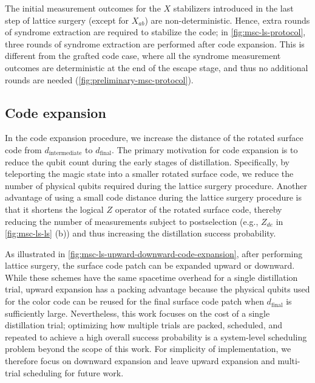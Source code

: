 The initial measurement outcomes for the $X$ stabilizers introduced in the last step of lattice surgery (except for $X_{ab}$) are non-deterministic.
Hence, extra rounds of syndrome extraction are required to stabilize the code; in \autoref{fig:msc-ls-protocol}, three rounds of syndrome extraction are performed after code expansion.
This is different from the grafted code case, where all the syndrome measurement outcomes are deterministic at the end of the escape stage, and thus no additional rounds are needed (\autoref{fig:preliminary-msc-protocol}).

\subsection{Code expansion}
\label{subsec:msc-ls-code-expansion}
In the code expansion procedure, we increase the distance of the rotated surface code from $d_{\mathrm{intermediate}}$ to $d_{\mathrm{final}}$.
The primary motivation for code expansion is to reduce the qubit count during the early stages of distillation.
Specifically, by teleporting the magic state into a smaller rotated surface code, we reduce the number of physical qubits required during the lattice surgery procedure.
Another advantage of using a small code distance during the lattice surgery procedure is that it shortens the logical $Z$ operator of the rotated surface code, thereby reducing the number of measurements subject to postselection (e.g., $Z_{de}$ in \autoref{fig:msc-ls-ls} (b)) and thus increasing the distillation success probability.


As illustrated in \autoref{fig:msc-ls-upward-downward-code-expansion}, after performing lattice surgery, the surface code patch can be expanded upward or downward.
While these schemes have the same spacetime overhead for a single distillation trial, upward expansion has a packing advantage because the physical qubits used for the color code can be reused for the final surface code patch when $d_{\mathrm{final}}$ is sufficiently large.
Nevertheless, this work focuses on the cost of a single distillation trial; optimizing how multiple trials are packed, scheduled, and repeated to achieve a high overall success probability is a system-level scheduling problem beyond the scope of this work.
For simplicity of implementation, we therefore focus on downward expansion and leave upward expansion and multi-trial scheduling for future work.

